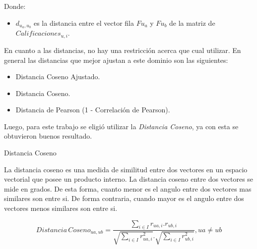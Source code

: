 \documentclass[11pt,a4paper,twoside]{thesis}
\begin{document}
\begin{description}
	\item[Donde:]
\end{description}
\begin{itemize}
	\item $d_{u_a,u_b}$ es la distancia entre el vector fila $F{u_a}$ y $F{u_b}$ de la matriz de $Calificaciones_{u,i}$.
\end{itemize}


En cuanto a las distancias, no hay una restricción acerca que cual utilizar. En general las distancias que mejor ajustan a este dominio son las siguientes:

\begin{itemize}
	\item Distancia Coseno Ajustado.
	\item Distancia Coseno.
	\item Distancia de Pearson (1 - Correlación de Pearson).
\end{itemize}

Luego, para este trabajo se eligió utilizar la \textit{Distancia Coseno}, ya con esta se obtuvieron buenos resultado.

\begin{description}
	\item[Distancia Coseno]
\end{description}

La distancia coseno es una medida de similitud entre dos vectores en un espacio vectorial que posee un producto interno. La distancia coseno entre dos vectores se mide en grados. 
De esta forma, cuanto menor es el angulo entre dos vectores mas similares son entre si. De forma contraria, cuando mayor es el angulo entre dos vectores menos similares son entre si.

\begin{equation}
	Distancia \mspace{3mu}Coseno_{ua, ub} = \frac{ \sum_{i \in I} r_{ua, i}.r_{ub, i}}{\sqrt{\sum_{i \in I} r_{ua, i}^2}.\sqrt{\sum_{i \in I} r_{ub, i}^2}  }, ua \neq ub
\end{equation}
\end{document}
